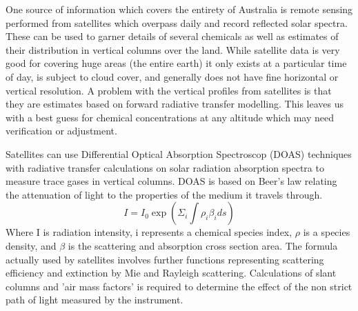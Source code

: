 One source of information which covers the entirety of Australia is remote sensing performed from satellites which overpass daily and record reflected solar spectra.
These can be used to garner details of several chemicals as well as estimates of their distribution in vertical columns over the land.
While satellite data is very good for covering huge areas (the entire earth) it only exists at a particular time of day, is subject to cloud cover, and generally does not have fine horizontal or vertical resolution.
A problem with the vertical profiles from satellites is that they are estimates based on forward radiative transfer modelling.
This leaves us with a best guess for chemical concentrations at any altitude which may need verification or adjustment.

Satellites can use Differential Optical Absorption Spectroscop (DOAS) techniques with radiative transfer calculations on solar radiation absorption spectra to measure trace gases in vertical columns.
DOAS is based on Beer's law relating the attenuation of light to the properties of the medium it travels through. 
$$ I = I_0 \exp \left( \Sigma_i \int \rho_i \beta_i ds \right) $$
Where I is radiation intensity, i represents a chemical species index, $\rho$ is a species density, and $\beta$ is the scattering and absorption cross section area.
The formula actually used by satellites involves further functions representing scattering efficiency and extinction by Mie and Rayleigh scattering.
Calculations of slant columns and 'air mass factors' is required to determine the effect of the non strict path of light measured by the instrument.